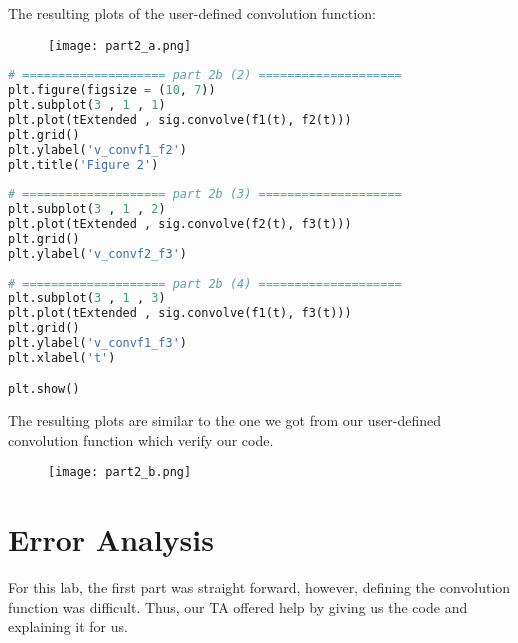\documentclass[12pt,a4paper]{article}
\begin{document}
\begin{itemize}
    The resulting plots of the user-defined convolution function:\\
\begin{figure}[h]
    \centering
    \texttt{[image: part2\_a.png]}
\end{figure}\textbf{}
\clearpage

\begin{lstlisting}[language=Python, caption={Convolution using scipy.signal.convolve()}, label={lst:code}, mathescape=true, breaklines=true]
# ==================== part 2b (2) ====================
plt.figure(figsize = (10, 7))
plt.subplot(3 , 1 , 1)
plt.plot(tExtended , sig.convolve(f1(t), f2(t)))
plt.grid()
plt.ylabel('v_convf1_f2')
plt.title('Figure 2')
 
# ==================== part 2b (3) ====================
plt.subplot(3 , 1 , 2)
plt.plot(tExtended , sig.convolve(f2(t), f3(t)))
plt.grid()
plt.ylabel('v_convf2_f3')
 
# ==================== part 2b (4) ====================
plt.subplot(3 , 1 , 3)
plt.plot(tExtended , sig.convolve(f1(t), f3(t)))
plt.grid()
plt.ylabel('v_convf1_f3')
plt.xlabel('t')

plt.show()
\end{lstlisting}

    The resulting plots are similar to the one we got from our user-defined convolution function which verify our code.\\
\begin{figure}[h]
    \centering
    \texttt{[image: part2\_b.png]}
\end{figure}\textbf{}

\end{itemize}
\section{Error Analysis}\label{sec:res}
    For this lab, the first part was straight forward, however, defining the convolution function was difficult. Thus, our TA offered help by giving us the code and explaining it for us. 
\end{document}
